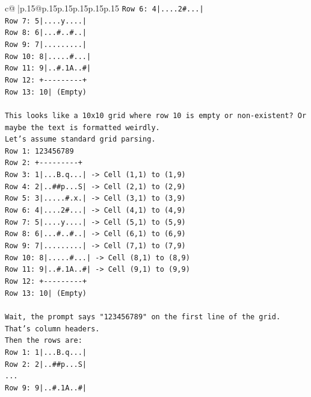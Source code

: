 \documentclass{article}
\begin{document}
{\begin{supertabular}{c@{$\;$}|p{.15\linewidth}@{}p{.15\linewidth}p{.15\linewidth}p{.15\linewidth}p{.15\linewidth}p{.15\linewidth}}
{{{\texttt{Row 6: 4|....2\#...|} \\
\texttt{Row 7: 5|....y....|} \\
\texttt{Row 8: 6|...\#..\#..|} \\
\texttt{Row 9: 7|.........|} \\
\texttt{Row 10: 8|.....\#...|} \\
\texttt{Row 11: 9|..\#.1A..\#|} \\
\texttt{Row 12: +{-}{-}{-}{-}{-}{-}{-}{-}{-}+} \\
\texttt{Row 13: 10| (Empty)} \\
\\ 
\texttt{This looks like a 10x10 grid where row 10 is empty or non{-}existent? Or maybe the text is formatted weirdly.} \\
\texttt{Let's assume standard grid parsing.} \\
\texttt{Row 1: 123456789} \\
\texttt{Row 2: +{-}{-}{-}{-}{-}{-}{-}{-}{-}+} \\
\texttt{Row 3: 1|...B.q...| {-}> Cell (1,1) to (1,9)} \\
\texttt{Row 4: 2|..\#\#p...S| {-}> Cell (2,1) to (2,9)} \\
\texttt{Row 5: 3|.....\#.x.| {-}> Cell (3,1) to (3,9)} \\
\texttt{Row 6: 4|....2\#...| {-}> Cell (4,1) to (4,9)} \\
\texttt{Row 7: 5|....y....| {-}> Cell (5,1) to (5,9)} \\
\texttt{Row 8: 6|...\#..\#..| {-}> Cell (6,1) to (6,9)} \\
\texttt{Row 9: 7|.........| {-}> Cell (7,1) to (7,9)} \\
\texttt{Row 10: 8|.....\#...| {-}> Cell (8,1) to (8,9)} \\
\texttt{Row 11: 9|..\#.1A..\#| {-}> Cell (9,1) to (9,9)} \\
\texttt{Row 12: +{-}{-}{-}{-}{-}{-}{-}{-}{-}+} \\
\texttt{Row 13: 10| (Empty)} \\
\\ 
\texttt{Wait, the prompt says "123456789" on the first line of the grid. That's column headers.} \\
\texttt{Then the rows are:} \\
\texttt{Row 1: 1|...B.q...|} \\
\texttt{Row 2: 2|..\#\#p...S|} \\
\texttt{...} \\
\texttt{Row 9: 9|..\#.1A..\#|} \\
}}}
\end{supertabular}}
\end{document}
